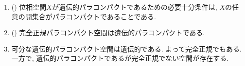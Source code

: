 \documentclass[uplatex, dvipdfmx, a4paper, 12pt, class=jsarticle, crop=false]{standalone}
\begin{document}
\begin{problem}[5.1.F]\label{eng-5-1-F-problem}
    \begin{enumerate}
        \item({\Dieudonne [1944]})
        位相空間\(X\)が遺伝的パラコンパクトであるための必要十分条件は,
        \(X\)の任意の開集合がパラコンパクトであることである.

        \item({\Dowker [1947a]})
        完全正規パラコンパクト\Hausdorff 空間は遺伝的パラコンパクトである.

        \item 可分な遺伝的パラコンパクト\Hausdorff 空間は遺伝的\Lindelof である.
        よって完全正規でもある.
        一方で, 遺伝的パラコンパクト\Hausdorff であるが完全正規でない空間が存在する.
    \end{enumerate}
\end{problem}
\end{document}
